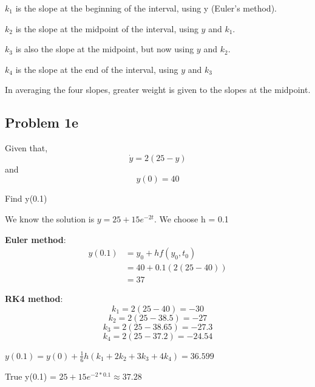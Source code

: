 $k_1$  is the slope at the beginning of the interval, using y (Euler's method).

$k_2$ is the slope at the midpoint of the interval, using $y$ and $ k_1$.

$k_3$ is also the slope at the midpoint, but now using $y$ and $k_2$.

$k_4$ is the slope at the end of the interval, using $y$ and $k_3$

\noindent    In averaging the four slopes, greater weight is given to the slopes at the midpoint. 
\subsection{Problem 1e}  

Given that,
\[\Dot{y} = 2(25-y)\] and
\[y(0) = 40\]

Find y(0.1)

We know the solution is $y = 25 + 15e^{-2t}$. We choose h = 0.1

\textbf{Euler method}: 
\begin{align*}
   y(0.1) &= y_0+hf(y_0,t_0)\\
        &= 40+0.1(2(25-40))\\
        &= 37
\end{align*}

\textbf{RK4 method}:
\[k_1=2(25-40)=-30\]
\[k_2=2(25-38.5)=-27\]
\[k_3=2(25-38.65)=-27.3\]
\[k_4=2(25-37.2)=-24.54\]


$y(0.1) = y(0)+\frac{1}{6}h(k_1+2k_2+3k_3+4k_4)=36.599$



True y(0.1) = $25+15e^{-2*0.1} \approx 37.28 $

